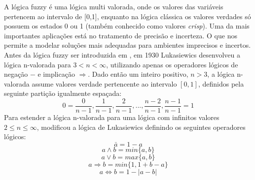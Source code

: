 A lógica fuzzy é uma lógica multi valorada, onde os valores das variáveis pertencem ao intervalo de
[0,1], enquanto na lógica clássica os valores verdades só possuem os estados 0 ou 1 (também
conhecido como valores {\it crisp\/}). Uma da mais importantes aplicações está no tratamento de
precisão e incerteza. O que nos permite a modelar soluções mais adequadas para ambientes imprecisos
e incertos.  Antes da lógica fuzzy ser introduzida em \cite{Zadeh1965}, em 1930
Lukasiewics\cite{Chen2000} desenvolveu a lógica n-valorada para $3 < n < \infty$, utilizando apenas
os operadores lógicos de negação $-$ e implicação $\Rightarrow$. Dado então um inteiro positivo, $n
> 3$, a lógica n-valorada assume valores verdade pertencente ao intervalo $[0,1]$, definidos pela
seguinte partição igualmente espaçada: $$0 =  \frac{0}{n-1},
\frac{1}{n-1},\frac{2}{n-1},...,\frac{n-2}{n-1},\frac{n-1}{n-1} = 1$$ Para estender a lógica
n-valorada para uma lógica com infinitos valores $2 \leq n \leq \infty$, \cite{Zadeh1965} modificou
a lógica de Lukasiewics definindo os seguintes operadores lógicos: $$\bar{a} = 1 -a$$ $$a \wedge b =
min\{a,b\}$$ $$a \vee b = max\{a,b\}$$ $$a \Rightarrow b = min\{1, 1+b-a\}$$ $$a \Leftrightarrow  b
= 1 - |a-b|$$

